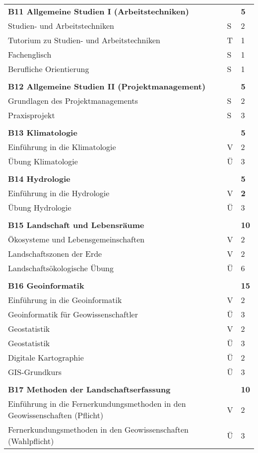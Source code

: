\begin{longtable}{p{} p{} p{}}
\textbf{B11 Allgemeine Studien I (Arbeitstechniken)}& & \textbf{5}\\
Studien- und Arbeitstechniken & S & 2\\
Tutorium zu Studien- und Arbeitstechniken & T & 1\\
Fachenglisch & S & 1\\
Berufliche Orientierung & S & 1\\
&&\\
\textbf{B12 Allgemeine Studien II (Projektmanagement)}&& \textbf{5}\\
Grundlagen des Projektmanagements & S & 2\\
Praxisprojekt & S & 3\\
&&\\
\textbf{B13 Klimatologie} && \textbf{5}\\
Einführung in die Klimatologie & V & 2\\
Übung Klimatologie & Ü & 3\\
&&\\
\textbf{B14 Hydrologie} && \textbf{5}\\
Einführung in die Hydrologie & V & \textbf{2}\\
Übung Hydrologie &Ü&3\\
&&\\
\textbf{B15 Landschaft und Lebensräume} & & \textbf{10}\\
Ökosysteme und Lebensgemeinschaften & V & 2\\
Landschaftszonen der Erde & V & 2\\
Landschaftsökologische Übung & Ü & 6\\
&&\\
\textbf{B16 Geoinformatik}&& \textbf{15}\\
Einführung in die Geoinformatik & V & 2\\
Geoinformatik für Geowissenschaftler & Ü & 3\\
Geostatistik & V & 2\\
Geostatistik & Ü & 3\\
Digitale Kartographie & Ü & 2\\
GIS-Grundkurs & Ü & 3\\
&&\\
\textbf{B17 Methoden der Landschaftserfassung}&&\textbf{10}\\
Einführung in die Fernerkundungsmethoden in den Geowissenschaften (Pflicht) & V & 2\\
Fernerkundungsmethoden in den Geowissenschaften (Wahlpflicht) & Ü & 3\\

\end{longtable}
